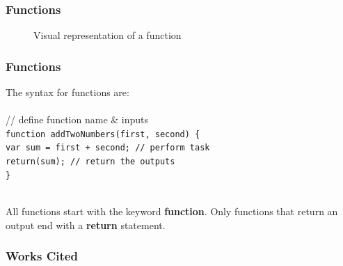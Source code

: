 \documentclass[aspectratio=169]{beamer}
\begin{document}
\begin{frame}
\frametitle{Functions}
\begin{figure}
\caption{Visual representation of a function}
\end{figure}
\end{frame}

\begin{frame}
\frametitle{Functions}
The syntax for functions are:\\
\mbox{}\\
// define function name \& inputs\\
\texttt{function addTwoNumbers(first, second) \{\\
\quad var sum = first + second; // perform task\\
\quad return(sum); // return the outputs\\
\}
}

\pause
\mbox{}\\
All functions start with the keyword \textbf{function}. Only functions that return an output end with a \textbf{return} statement.
\end{frame}


\begin{frame}
\frametitle{Works Cited}

\end{frame}
\end{document}
